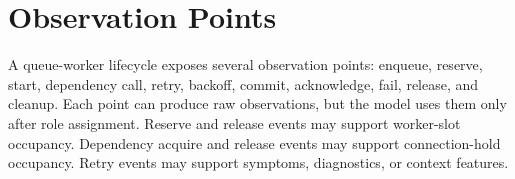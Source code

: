 \section{Observation Points}
\label{sec:observation-points}

A queue-worker lifecycle exposes several observation points: enqueue, reserve,
start, dependency call, retry, backoff, commit, acknowledge, fail, release, and
cleanup. Each point can produce raw observations, but the model uses them only
after role assignment. Reserve and release events may support worker-slot
occupancy. Dependency acquire and release events may support connection-hold
occupancy. Retry events may support symptoms, diagnostics, or context features.
